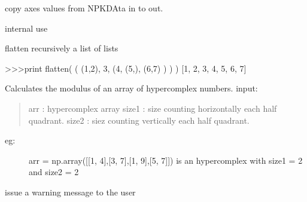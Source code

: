 \documentclass[letterpaper,10pt,openany,oneside]{sphinxmanual}
\begin{document}

\begin{fulllineitems}
\label{rst/code:NPKData.copyaxes}
copy axes values from NPKDAta in to out.

internal use

\end{fulllineitems}


\begin{fulllineitems}
\label{rst/code:NPKData.flatten}
flatten recursively a list of lists

\textgreater{}\textgreater{}\textgreater{}print flatten( ( (1,2), 3, (4, (5,), (6,7) ) ) )
{[}1, 2, 3, 4, 5, 6, 7{]}

\end{fulllineitems}


\begin{fulllineitems}
\label{rst/code:NPKData.hypercomplex_modulus}
Calculates the modulus of an array of hypercomplex numbers.
input:
\begin{quote}

arr : hypercomplex array
size1 : size counting horizontally each half quadrant.
size2 : siez counting vertically each half quadrant.
\end{quote}
\begin{description}
\item[{eg:}] \leavevmode
arr = np.array({[}{[}1, 4{]},{[}3, 7{]},{[}1, 9{]},{[}5, 7{]}{]})
is an hypercomplex with size1 = 2 and size2 = 2

\end{description}

\end{fulllineitems}


\begin{fulllineitems}
\label{rst/code:NPKData.warning}
issue a warning message to the user

\end{fulllineitems}
\end{document}
